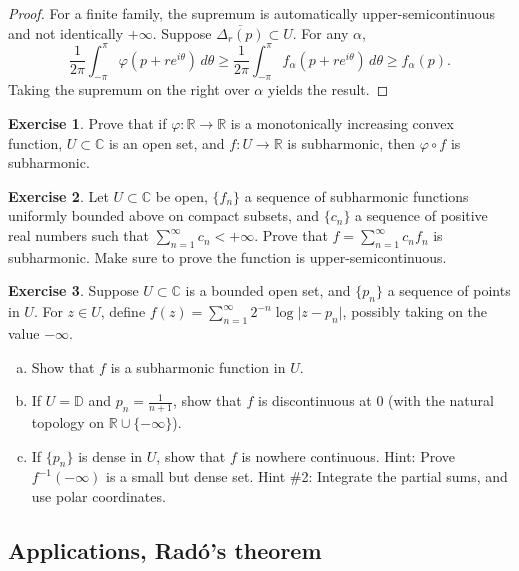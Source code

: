 \documentclass[12pt,openany]{book}
\newcommand{\sabs}[1]{\lvert {#1} \rvert}
\newcommand{\C}{{\mathbb{C}}}
\newcommand{\R}{{\mathbb{R}}}
\newcommand{\D}{{\mathbb{D}}}
\theoremstyle{plain}
\theoremstyle{remark}
\theoremstyle{definition}
\newenvironment{exbox}{%
    \def\FrameCommand{\vrule width 1pt \relax\hspace{10pt}}%
    \MakeFramed{\advance\hsize-\width\FrameRestore}%
}{%
    \endMakeFramed
}
\newenvironment{exparts}{%
    \leavevmode\begin{enumerate}[a),noitemsep,topsep=0pt,parsep=0pt,partopsep=0pt]
}{%
    \end{enumerate}
}
\theoremstyle{exercise}
\newtheorem{exercise}{Exercise}[section]
\theoremstyle{example}
\begin{document}
\begin{proof}
For a finite family, the supremum is automatically
upper-semicontinuous and not identically $+\infty$.
Suppose $\overline{\Delta_r(p)} \subset U$.  For any $\alpha$,
\begin{equation*}
\frac{1}{2\pi} \int_{-\pi}^{\pi} \varphi (p+re^{i\theta})\, d\theta 
\geq
\frac{1}{2\pi} \int_{-\pi}^{\pi} f_\alpha (p+re^{i\theta})\, d\theta 
\geq f_\alpha(p) .
\end{equation*}
Taking the supremum on the right over $\alpha$ yields the result.
\end{proof}

\begin{exbox}
\begin{exercise}
Prove that if $\varphi \colon \R \to \R$ is a monotonically increasing
convex function, $U \subset \C$ is an open set, and $f \colon U \to \R$
is subharmonic, then $\varphi \circ f$ is subharmonic.
\end{exercise}

\begin{exercise}
Let $U \subset \C$ be open, $\{ f_n \}$ a sequence of 
subharmonic functions uniformly bounded above on compact subsets, and 
$\{ c_n \}$ a sequence of positive real numbers such that
$\sum_{n=1}^\infty c_n < +\infty$.
Prove that $f = \sum_{n=1}^\infty c_n f_n$ is subharmonic.  Make sure to prove
the function is upper-semicontinuous.
\end{exercise}

\begin{exercise}
Suppose $U \subset \C$ is a bounded open set, and $\{ p_n \}$ a sequence of points in
$U$. For $z \in U$, define
$f(z) = \sum_{n=1}^\infty 2^{-n} \log \sabs{z-p_n}$, possibly taking on the
value $-\infty$.
\begin{exparts}
\item
Show that $f$ is a subharmonic function in $U$.
\item
If $U = \D$ and $p_n = \frac{1}{n+1}$, show that $f$ is discontinuous at $0$
(with the natural topology on $\R \cup \{ -\infty \}$).
\item
If $\{ p_n \}$ is dense in $U$, show that $f$ 
is nowhere continuous.
Hint: Prove $f^{-1}(-\infty)$ is a small but dense set.
Hint \#2: Integrate the partial sums, and use polar coordinates.
\end{exparts}
\end{exercise}
\end{exbox}

\subsection{Applications, Rad\'o's theorem}
\end{document}
